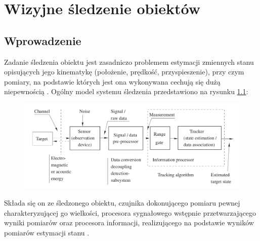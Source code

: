 \chapter{Wizyjne śledzenie obiektów}
\label{cha:Wizyjne_sledzenie_obiektow}

\section{Wprowadzenie}
\label{sec:Wizyjne_sledzenie_obiektow_wprowadzenie}

Zadanie śledzenia obiektu jest zasadniczo problemem estymacji zmiennych stanu opisujących jego kinematykę (położenie, prędkość, przyspieszenie), przy czym pomiary, na podstawie których jest ona wykonywana cechują się dużą niepewnością \cite{Challa2011}. Ogólny model systemu śledzenia przedstawiono na rysunku \ref{fig:Ogolny_model_systemu_sledzenia_obiektow}:

\begin{figure}[!htb]
	\begin{center}
		\includegraphics[width=12cm]{images/tracking_system_overview.png}
	\end{center}	
\label{fig:Ogolny_model_systemu_sledzenia_obiektow}
\end{figure}

Składa się on ze śledzonego obiektu, czujnika dokonującego pomiaru pewnej charakteryzującej go wielkości, procesora sygnałowego wstępnie przetwarzającego wyniki pomiarów oraz procesora informacji, realizującego na podstawie wyników pomiarów estymacji stanu \cite{Challa2011}.

